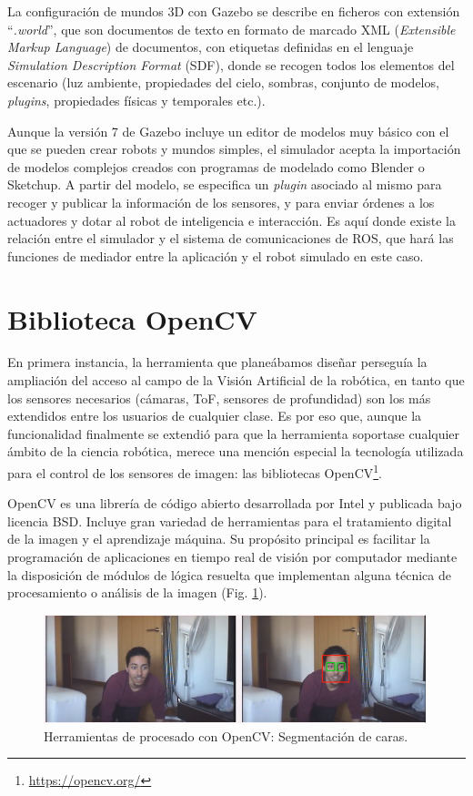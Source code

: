 La configuración de mundos 3D con Gazebo se describe en ficheros con extensión ``\textit{.world}'', que son documentos de texto en formato de marcado XML (\textit{Extensible Markup Language}) de documentos, con etiquetas definidas en el lenguaje \textit{Simulation Description Format} (SDF), donde se
recogen todos los elementos del escenario (luz ambiente, propiedades del cielo, sombras, conjunto de modelos, \textit{plugins}, propiedades
físicas y temporales etc.).
 
Aunque la versión 7 de Gazebo incluye un editor de modelos muy básico con el que se pueden crear robots y mundos simples, el simulador acepta la importación de modelos complejos creados con programas de modelado como Blender o Sketchup. A partir del modelo, se especifica un \textit{plugin} asociado al mismo para recoger y publicar la información de los sensores, y para enviar órdenes a los actuadores y dotar al robot de inteligencia e interacción. Es aquí donde existe la relación entre el simulador y el sistema de comunicaciones de ROS, que hará las funciones de mediador entre la aplicación y el robot simulado en este caso.

\section{Biblioteca OpenCV}
En primera instancia, la herramienta que planeábamos diseñar perseguía la ampliación del acceso al campo de la Visión Artificial de la robótica, en tanto que los sensores necesarios (cámaras, ToF, sensores de profundidad) son los más extendidos entre los usuarios de cualquier clase. Es por eso que, aunque la funcionalidad finalmente se extendió para que la herramienta soportase cualquier ámbito de la ciencia robótica, merece una mención especial la tecnología utilizada para el control de los sensores de imagen: las bibliotecas OpenCV\footnote{\url{https://opencv.org/}}.

OpenCV es una librería de código abierto desarrollada por Intel y publicada bajo licencia BSD. Incluye gran variedad de herramientas para el tratamiento digital de la imagen y el aprendizaje máquina. Su propósito principal es facilitar la programación de aplicaciones en tiempo real de visión por computador mediante la disposición de módulos de lógica resuelta que implementan alguna técnica de procesamiento o análisis de la imagen (Fig. \ref{opencv}).

\begin{figure}[!hbtp]  \centering\noindent
    \includegraphics[width=0.99\textwidth]{figures/opencv-face.png}
    \caption{Herramientas de procesado con OpenCV: Segmentación de caras.}
    \label{opencv}
\end{figure}

